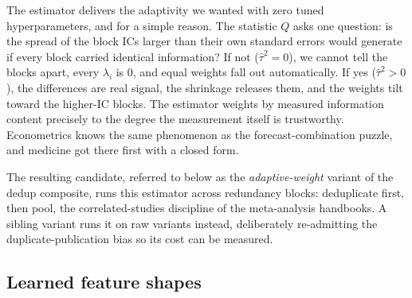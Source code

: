 \documentclass[11pt]{article}
\begin{document}
The estimator delivers the adaptivity we wanted with zero tuned hyperparameters, and for a
simple reason. The statistic $Q$ asks one question: is the spread of the block ICs larger
than their own standard errors would generate if every block carried identical
information? If not ($\hat\tau^2 = 0$), we cannot tell the blocks apart, every
$\lambda_i$ is 0, and equal weights fall out automatically. If yes ($\hat\tau^2 > 0$),
the differences are real signal, the shrinkage releases them, and the weights tilt toward
the higher-IC blocks. The estimator weights by measured information content precisely to
the degree the measurement itself is trustworthy. Econometrics knows the same phenomenon
as the forecast-combination puzzle, and medicine got there first with a closed form.

The resulting candidate, referred to below as the \emph{adaptive-weight} variant of the
dedup composite, runs this estimator across redundancy blocks: deduplicate first, then
pool, the correlated-studies discipline of the meta-analysis handbooks. A sibling variant
runs it on raw variants instead, deliberately re-admitting the duplicate-publication bias
so its cost can be measured.

\subsection{Learned feature shapes}
\label{sec:methods-shapes}
\end{document}
